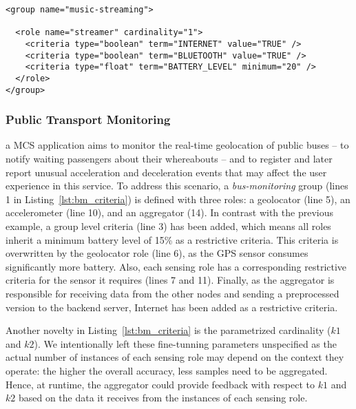\begin{lstlisting}[caption=Specification of the music streaming group, label=lst:ms_criteria, captionpos=t]
<group name="music-streaming">

  <role name="streamer" cardinality="1">
    <criteria type="boolean" term="INTERNET" value="TRUE" />
    <criteria type="boolean" term="BLUETOOTH" value="TRUE" />
    <criteria type="float" term="BATTERY_LEVEL" minimum="20" />
  </role>
</group>
\end{lstlisting}

\subsubsection{Public Transport Monitoring}  

a MCS application aims to monitor the real-time geolocation of public buses -- to notify waiting passengers about their whereabouts -- and to register and later report unusual acceleration and deceleration events that may affect the user experience in this service. To address this scenario, a \textit{bus-monitoring} group (lines 1 in Listing~\ref{lst:bm_criteria}) is defined with three roles: a geolocator (line 5), an accelerometer (line 10), and an aggregator (14). In contrast with the previous example, a group level criteria (line 3) has been added, which means all roles inherit a minimum battery level of 15\% as a restrictive criteria. This criteria is overwritten by the geolocator role (line 6), as the GPS sensor consumes significantly more battery. Also, each sensing role has a corresponding restrictive criteria for the sensor it requires (lines 7 and 11). Finally, as the aggregator is responsible for receiving data from the other nodes and sending a preprocessed version to the backend server, Internet has been added as a restrictive criteria.

Another novelty in Listing~\ref{lst:bm_criteria} is the parametrized cardinality ($k1$ and $k2$). We intentionally left these fine-tunning parameters unspecified as the actual number of instances of each sensing role may depend on the context they operate: the higher the overall accuracy, less samples need to be aggregated. Hence, at runtime, the aggregator could provide feedback with respect to $k1$ and $k2$ based on the data it receives from the instances of each sensing role. 



